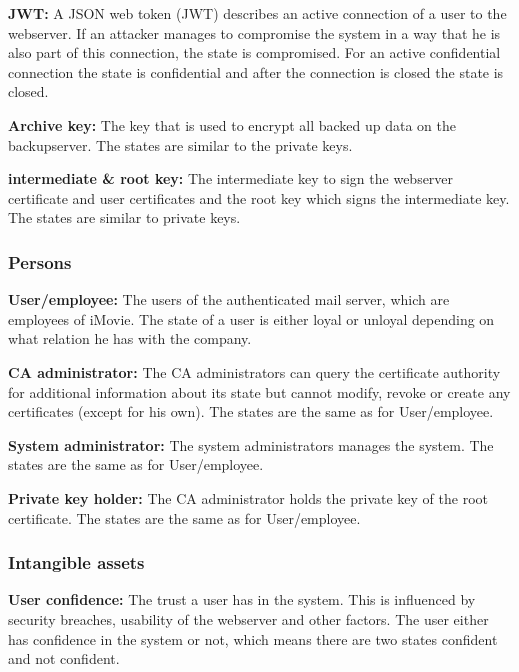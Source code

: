 \documentclass[english]{article}
\begin{document}
\begin{description}
		\item{\textbf{JWT:}} A JSON web token (JWT) describes an active connection of a user to the webserver. If an attacker manages to compromise the system in a way that he is also part of this connection, the state is compromised. For an active confidential connection the state is confidential and after the connection is closed the state is closed.
		\item{\textbf{Archive key:}} The key that is used to encrypt all backed up data on the backupserver. The states are similar to the private keys.
		\item{\textbf{intermediate \& root key:}} The intermediate key to sign the webserver certificate and user certificates and the root key which signs the intermediate key. The states are similar to private keys.
	\end{description}

\subsubsection{Persons}
\begin{description}
\item{\textbf{User/employee:}} The users of the authenticated mail server, which are employees of iMovie. The state of a user is either loyal or unloyal depending on what relation he has with the company.
\item{\textbf{CA administrator:}} The CA administrators can query the certificate authority for additional information about its state but cannot modify, revoke or create any certificates (except for his own). The states are the same as for User/employee.
  \item{\textbf{System administrator:}} The system administrators manages the system. The states are the same as for User/employee.
  \item{\textbf{Private key holder:}} The CA administrator holds the private key of the root certificate. The states are the same as for User/employee.
\end{description}


\subsubsection{Intangible assets}
\begin{description}
\item{\textbf{User confidence:}} The trust a user has in the system. This is influenced by security breaches, usability of the webserver and other factors. The user either has confidence in the system or not, which means there are two states confident and not confident.
  \end{description}
\end{document}
